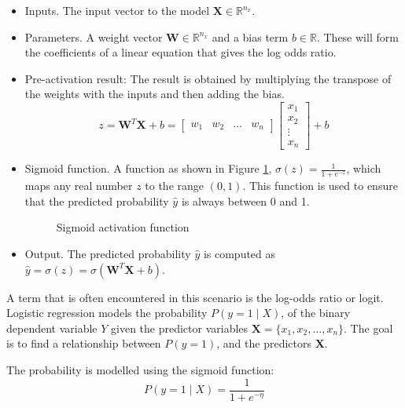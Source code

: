\documentclass[conference]{IEEEtran}
\begin{document}
	\begin{itemize}[]
		\item Inputs. The input vector to the model $\textbf{X} \in \mathbb{R}^{n_x}$.

		\item Parameters. A weight vector $\textbf{W} \in \mathbb{R}^{n_x}$ and a bias term $b \in \mathbb{R}$.  These will form the coefficients of a linear equation that gives the log odds ratio.

		\item Pre-activation result: The result is obtained by multiplying the transpose of the weights with the inputs and then adding the bias. 
		$$z= \textbf{W}^{T}\textbf{X} + b = \begin{bmatrix} w_1 & w_2 & \dots & w_n\end{bmatrix}\begin{bmatrix} x_1\\ x_2 \\ \vdots \\x_n\end{bmatrix} + b$$
		
	
		\item Sigmoid function. A function as shown in Figure \ref{fig:sigmoid}, $\sigma(z) = \frac{1}{1 + e^{-z}}$, which maps any real number $z$ to the range $(0,1)$. This function is used to ensure that the predicted probability $\hat{y}$ is always between 0 and 1.
		
		\begin{figure}[H]
			\centering
			
			\caption{Sigmoid activation function}
			\label{fig:sigmoid}
		\end{figure}

		\item Output. The predicted probability $\hat{y}$ is computed as $\hat{y} = \sigma(z) = \sigma(\textbf{W}^{T}\textbf{X} + b)$.
	\end{itemize}
	
	\bigskip
	
	A term that is often encountered in this scenario is the log-odds ratio or logit. Logistic regression models the probability $P(y = 1 \mid X)$, of the binary dependent variable $Y$ given the predictor variables $\textbf{X} = \{x_1, x_2, \dots, x_n\}$. The goal is to find a relationship between $P(y=1)$, and the predictors $\textbf{X}$.
	
	The probability is modelled using the sigmoid function:
	$$P(y = 1 \mid X) = \frac{1}{1 + e^{-\eta}}$$
	
\end{document}
